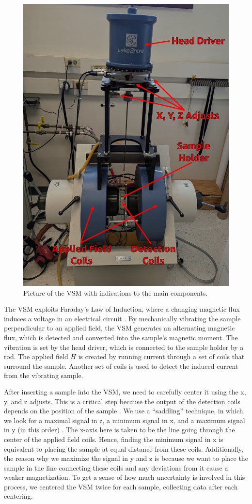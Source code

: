 \documentclass{../paper}
\begin{document}
\begin{figure}
  \centering
  \includegraphics[width=0.9\columnwidth]{data/VSM.png}
  \caption{Picture of the VSM with indications to the main components.}
  \label{fig:VSM}
\end{figure}

The VSM exploits Faraday's Law of Induction, where a changing magnetic flux induces a voltage in an electrical circuit \cite{Jiles}. By mechanically vibrating the sample perpendicular to an applied field, the VSM generates an alternating magnetic flux, which is detected and converted into the sample's magnetic moment. The vibration is set by the head driver, which is connected to the sample holder by a rod. The applied field $H$ is created by running current through a set of coils that surround the sample. Another set of coils is used to detect the induced current from the vibrating sample.

After inserting a sample into the VSM, we need to carefully center it using the x, y, and z adjusts. This is a critical step because the output of the detection coils depends on the position of the sample \cite{Oxford}. We use a ``saddling'' technique, in which we look for a maximal signal in z, a minimum signal in x, and a maximum signal in y (in this order) \cite{LabManual}. The x-axis here is taken to be the line going through the center of the applied field coils. Hence, finding the minimum signal in x is equivalent to placing the sample at equal distance from these coils. Additionally, the reason why we maximize the signal in y and z is because we want to place the sample in the line connecting these coils and any deviations from it cause a weaker magnetization. To get a sense of how much uncertainty is involved in this process, we centered the VSM twice for each sample, collecting data after each centering.
\end{document}

